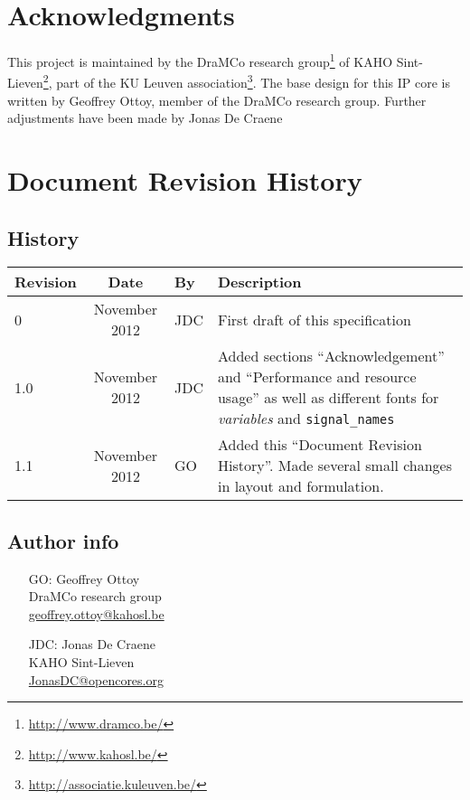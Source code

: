 \chapter*{Acknowledgments}
This project is maintained by the DraMCo research group\footnote{\url{http://www.dramco.be/}} of KAHO Sint-Lieven\footnote{\url{http://www.kahosl.be/}}, part of the KU Leuven association\footnote{\url{http://associatie.kuleuven.be/}}.
The base design for this IP core is written by Geoffrey Ottoy, member of the DraMCo research group. Further adjustments have been made by Jonas De Craene


\chapter*{Document Revision History} 

\section*{History}
\begin{tabular}{|l|c|l|p{10cm}|}
	\hline
	\rowcolor{Gray}
	\textbf{Revision} & \textbf{Date} & \textbf{By} & \textbf{Description} \\
	\hline
	0	& November 2012	& JDC	& First draft of this specification\\
	\hline
	1.0 & November 2012	& JDC	& Added sections ``Acknowledgement'' and ``Performance and resource usage'' as well as different fonts for \textit{variables} and \verb|signal_names|\\
	\hline
	1.1 & November 2012	& GO	& Added this ``Document Revision History''. Made several small changes in layout and formulation.\\
	\hline
\end{tabular}%

\section*{Author info}

\begin{itemize}
\item[GO:] Geoffrey Ottoy\\DraMCo research group\\\url{geoffrey.ottoy@kahosl.be}
\item[JDC:] Jonas De Craene\\KAHO Sint-Lieven\\\url{JonasDC@opencores.org}
\end{itemize}